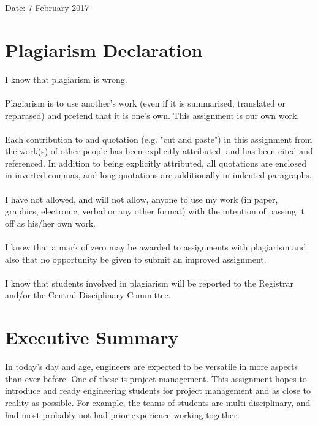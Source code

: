 \begin{titlepage}
\begin{center}
            \large
            Date: 7 February 2017
            
        \end{center}
\end{titlepage}

\newpage



\section*{Plagiarism Declaration}

I know that plagiarism is wrong.\\\\
\noindent
Plagiarism is to use another's work (even if it is summarised, translated or rephrased) and pretend that it is one's own. This assignment is our own work.\\\\
\noindent
Each contribution to and quotation (e.g. "cut and paste") in this assignment from the work(s) of other people has been explicitly attributed, and has been cited and referenced. In addition to being explicitly attributed, all quotations are enclosed in inverted commas, and long quotations are additionally in indented paragraphs.\\\\
\noindent
I have not allowed, and will not allow, anyone to use my work (in paper, graphics, electronic, verbal or any other format) with the intention of passing it off as his/her own work.\\\\
\noindent
I know that a mark of zero may be awarded to assignments with plagiarism and also that no opportunity be given to submit an improved assignment.\\\\
\noindent
I know that students involved in plagiarism will be reported to the Registrar and/or the Central Disciplinary Committee.

\section*{Executive Summary}
In today's day and age, engineers are expected to be versatile in more aspects than ever before. One of these is project management. This assignment hopes to introduce and ready engineering students for project management and as close to reality as possible. For example, the teams of students are multi-disciplinary, and had most probably not had prior experience working together.\\

